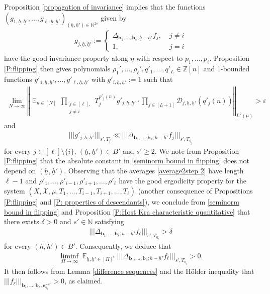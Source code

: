 \documentclass[11pt]{amsart}
\theoremstyle{definition}
\newcommand{\N}{{\mathbb N}}
\newcommand{\Z}{{\mathbb Z}}
\newcommand{\CD}{{\mathcal D}}
\newcommand{\CX}{{\mathcal X}}
\newcommand{\be}{{\mathbf{e}}}
\renewcommand{\b}{{\textbf{b}}}
\newcommand{\uh}{{\underline{h}}}
\newcommand{\veps}{\varepsilon}
\newcommand{\norm}[1]{\left\Vert #1\right\Vert}
\newcommand{\nnorm}[1]{\lvert\!|\!| #1|\!|\!\rvert}
\DeclareMathOperator*{\E}{\mathbb{E}}
\begin{document}
Proposition \ref{propagation of invariance} implies that the functions $(g_{1,\uh, \uh'}, \ldots, g_{\ell, \uh, \uh'})_{(\uh, \uh')\in \N^{2s}}$ given by
\begin{align*}
    g_{j, \uh, \uh'} := \begin{cases}\Delta_{{\b_1}, \ldots, {\b_{s}}; \uh-\uh'} f_j,\; &j \neq i\\
    1,\; &j = i
    \end{cases}
\end{align*}
have the good invariance property along $\eta$ with respect to $p_1, \ldots, p_\ell$. Proposition \ref{P:flipping} then gives polynomials $\rho_1', \ldots, \rho_\ell', q'_1, \ldots, q'_L\in\Z[n]$ and 1-bounded functions $g'_{1,\uh, \uh'}, \ldots, g'_{\ell,\uh, \uh'}$ with $g'_{i, \uh, \uh'} := 1$ such that
\begin{align}\label{average2step 2}
    \lim_{N\to\infty}\norm{\E_{n\in[N]} \, \prod_{\substack{j\in[\ell],\\ j\neq i}} T_j^{\rho'_j(n)} g'_{j,\uh, \uh'}\cdot \prod_{j\in[L+1]}\CD_{j,\uh,\uh'}(q'_j(n))}_{L^2(\mu)} > \veps
\end{align}
and
\begin{align}\label{seminorm bound in flipping}
\nnorm{g'_{j, \uh, \uh'}}_{s', T_j}\ll \nnorm{\Delta_{{\b_1}, \ldots, {\b_{s}}; \uh-\uh'} f_j}_{s', T_{\eta_j}}
\end{align}
for every $j\in[\ell]\setminus\{i\}$, $(\uh,\uh')\in B'$ and $s'\geq 2$. We note from Proposition \ref{P:flipping} that the absolute constant in \eqref{seminorm bound in flipping} does not depend on $(\uh, \uh')$. Observing that the averages \eqref{average2step 2} have length $\ell-1$ and $\rho'_1, \ldots, \rho'_{i-1}, \rho'_{i+1}, \ldots, \rho'_\ell$ have the good ergodicity property for the system $(X, \CX, \mu, T_1, \ldots, T_{i-1}, T_{i+1}, \ldots, T_\ell)$ (another consequence of Propositions \ref{P:flipping} and \ref{P: properties of descendants}), we conclude from \eqref{seminorm bound in flipping} and Proposition \ref{P:Host Kra characteristic quantitative} that there exists $\delta>0$ and $s'\in\N$ satisfying
\begin{align*}
    \nnorm{\Delta_{{\b_1}, \ldots, {\b_{s}}; \uh-\uh'} f_\ell}_{s', T_{\eta_\ell}}>\delta
\end{align*}
for every $(\uh, \uh')\in B'$. Consequently, we deduce that
\begin{align*}%
    \liminf_{H\to\infty}\E_{\uh, \uh'\in [H]^{s}}\nnorm{\Delta_{{\b_1}, \ldots, {\b_{s}}; \uh-\uh'} f_\ell}_{s', T_{\eta_\ell}}>0.
\end{align*}
It then follows from Lemma \ref{difference sequences} and the H\"older inequality that $\nnorm{f_\ell}_{{\b_1}, \ldots, {\b_{s}}, \be_{\eta_\ell}^{\times s'}}>0$, as claimed.
\end{document}
